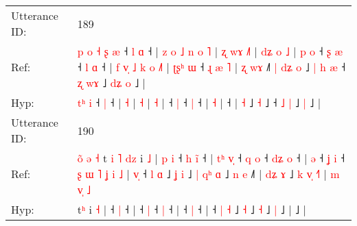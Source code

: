 \documentclass[10pt]{article}
\DeclareRobustCommand{\hl}[1]{{\textcolor{red}{#1}}}
\begin{document}
\begin{longtable}{ll}
 \\
\midrule
Utterance ID: & 189 \\
Ref: & \hl{p}\hl{ }\hl{o}\hl{ }\hl{˧}\hl{ }\hl{ʂ} \hl{æ} ˧\hl{ }\hl{l} \hl{ɑ} ˧ |\hl{ }\hl{z}\hl{ }\hl{o}\hl{ }\hl{˩}\hl{ }\hl{n}\hl{ }\hl{o} \hl{˥} |\hl{ }\hl{ʐ}\hl{ }\hl{w}\hl{ɤ} \hl{˩}\hl{˥} |\hl{ }\hl{d}\hl{ʑ}\hl{ }\hl{o} \hl{˩} |\hl{ }\hl{p}\hl{ }\hl{o} ˧\hl{ }\hl{ʂ} \hl{æ} ˧\hl{ }\hl{l} \hl{ɑ} ˧ |\hl{ }\hl{f}\hl{ }\hl{v}\hl{̩}\hl{ }\hl{˩}\hl{ }\hl{k}\hl{ }\hl{o} \hl{˩}\hl{˥} |\hl{ }\hl{ʈ}\hl{ʂ}\hl{ʰ}\hl{ }\hl{ɯ} ˧\hl{ }\hl{ɻ}\hl{ }\hl{æ}\hl{ }\hl{˥} |\hl{ }\hl{ʐ} \hl{w}\hl{ɤ} ˩\hl{˥}\hl{ }\hl{|}\hl{ }\hl{d}\hl{ʑ} \hl{o} ˩\hl{ }\hl{|}\hl{ }\hl{h}\hl{ }\hl{æ} ˧ \hl{ʐ} \hl{w}\hl{ɤ} ˩\hl{ }\hl{d}\hl{ʑ} \hl{o} ˩ |
 \\
Hyp: & \hl{}\hl{}\hl{}\hl{}\hl{}\hl{t}\hl{ʰ} \hl{i} ˧\hl{}\hl{} \hl{|} ˧ |\hl{}\hl{}\hl{}\hl{}\hl{}\hl{}\hl{}\hl{}\hl{}\hl{} \hl{˧} |\hl{}\hl{}\hl{}\hl{}\hl{} \hl{}\hl{˧} |\hl{}\hl{}\hl{}\hl{}\hl{} \hl{˧} |\hl{}\hl{}\hl{}\hl{} ˧\hl{}\hl{} \hl{|} ˧\hl{}\hl{} \hl{|} ˧ |\hl{}\hl{}\hl{}\hl{}\hl{}\hl{}\hl{}\hl{}\hl{}\hl{}\hl{} \hl{}\hl{˧} |\hl{}\hl{}\hl{}\hl{}\hl{}\hl{} ˧\hl{}\hl{}\hl{}\hl{}\hl{}\hl{} |\hl{}\hl{} \hl{}\hl{˧} ˩\hl{}\hl{}\hl{}\hl{}\hl{}\hl{} \hl{˧} ˩\hl{}\hl{}\hl{}\hl{}\hl{}\hl{} ˧ \hl{˩} \hl{}\hl{|} ˩\hl{}\hl{}\hl{} \hl{|} ˩ |
 \\
\midrule
Utterance ID: & 190 \\
Ref: & \hl{o}\hl{̃}\hl{ }\hl{ə}\hl{ }\hl{˧}\hl{ }t\hl{ }\hl{i}\hl{ }\hl{˥}\hl{ }\hl{d}\hl{z} i \hl{˩} |\hl{ }\hl{p}\hl{ }\hl{i} ˧\hl{ }\hl{h} \hl{i}\hl{̃} ˧ |\hl{ }\hl{t}\hl{ʰ}\hl{ }\hl{v}\hl{̩} ˧\hl{ }\hl{q} \hl{o} ˧\hl{ }\hl{d}\hl{ʑ} \hl{o} ˧ |\hl{ }\hl{ə} ˧\hl{ }\hl{ʝ} \hl{i} ˧\hl{ }\hl{ʂ}\hl{ }\hl{ɯ}\hl{ }\hl{˥}\hl{ }\hl{ʝ}\hl{ }\hl{i}\hl{ }\hl{˩} |\hl{ }\hl{v}\hl{̩} ˧ \hl{l} \hl{ɑ} ˩\hl{ }\hl{ʝ} \hl{i} ˩\hl{ }\hl{|}\hl{ }\hl{q}\hl{ʰ} \hl{ɑ} ˩\hl{ }\hl{n} \hl{e} ˩\hl{˥} |\hl{ }\hl{d}\hl{ʑ}\hl{ }\hl{ɤ} ˩\hl{ }\hl{k}\hl{ }\hl{v}\hl{̩}\hl{ }\hl{˧}\hl{˥} |\hl{ }\hl{m}\hl{ }\hl{v}\hl{̩}\hl{ }\hl{˩}
 \\
Hyp: & \hl{}\hl{}\hl{}\hl{}\hl{}\hl{}\hl{}t\hl{}\hl{}\hl{}\hl{}\hl{}\hl{}\hl{ʰ} i \hl{˧} |\hl{}\hl{}\hl{}\hl{} ˧\hl{}\hl{} \hl{}\hl{|} ˧ |\hl{}\hl{}\hl{}\hl{}\hl{}\hl{} ˧\hl{}\hl{} \hl{|} ˧\hl{}\hl{}\hl{} \hl{|} ˧ |\hl{}\hl{} ˧\hl{}\hl{} \hl{|} ˧\hl{}\hl{}\hl{}\hl{}\hl{}\hl{}\hl{}\hl{}\hl{}\hl{}\hl{}\hl{} |\hl{}\hl{}\hl{} ˧ \hl{|} \hl{˧} ˩\hl{}\hl{} \hl{˧} ˩\hl{}\hl{}\hl{}\hl{}\hl{} \hl{˧} ˩\hl{}\hl{} \hl{|} ˩\hl{} |\hl{}\hl{}\hl{}\hl{}\hl{} ˩\hl{}\hl{}\hl{}\hl{}\hl{}\hl{}\hl{}\hl{} |\hl{}\hl{}\hl{}\hl{}\hl{}\hl{}\hl{}

\end{longtable}
\end{document}
